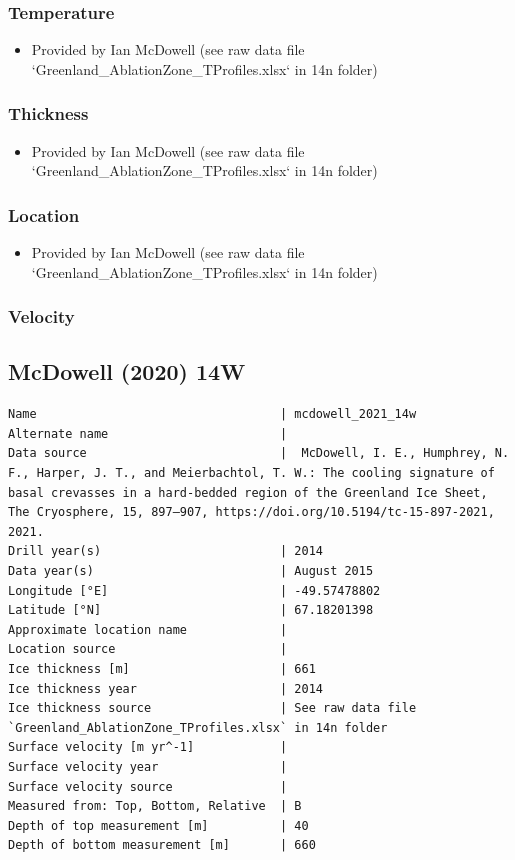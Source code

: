 \documentclass[article,a4paper,times,11pt,twoside]{article}
\begin{document}
\subsubsection{Temperature}
\label{sec:org1c2c31b}

\begin{itemize}
\item Provided by Ian McDowell (see raw data file `Greenland\_AblationZone\_TProfiles.xlsx` in 14n folder)
\end{itemize}

\subsubsection{Thickness}
\label{sec:org057ed99}

\begin{itemize}
\item Provided by Ian McDowell (see raw data file `Greenland\_AblationZone\_TProfiles.xlsx` in 14n folder)
\end{itemize}

\subsubsection{Location}
\label{sec:orgc431882}

\begin{itemize}
\item Provided by Ian McDowell (see raw data file `Greenland\_AblationZone\_TProfiles.xlsx` in 14n folder)
\end{itemize}

\subsubsection{Velocity}
\label{sec:orgccae7c7}
\clearpage
\subsection{McDowell (2020) 14W}
\label{sec:org89bfa99}
\begin{verbatim}
Name                                  | mcdowell_2021_14w
Alternate name                        | 
Data source                           |  McDowell, I. E., Humphrey, N. F., Harper, J. T., and Meierbachtol, T. W.: The cooling signature of basal crevasses in a hard-bedded region of the Greenland Ice Sheet, The Cryosphere, 15, 897–907, https://doi.org/10.5194/tc-15-897-2021, 2021.
Drill year(s)                         | 2014
Data year(s)                          | August 2015
Longitude [°E]                        | -49.57478802
Latitude [°N]                         | 67.18201398
Approximate location name             | 
Location source                       | 
Ice thickness [m]                     | 661
Ice thickness year                    | 2014
Ice thickness source                  | See raw data file `Greenland_AblationZone_TProfiles.xlsx` in 14n folder
Surface velocity [m yr^-1]            | 
Surface velocity year                 | 
Surface velocity source               | 
Measured from: Top, Bottom, Relative  | B
Depth of top measurement [m]          | 40
Depth of bottom measurement [m]       | 660
\end{verbatim}
\end{document}
